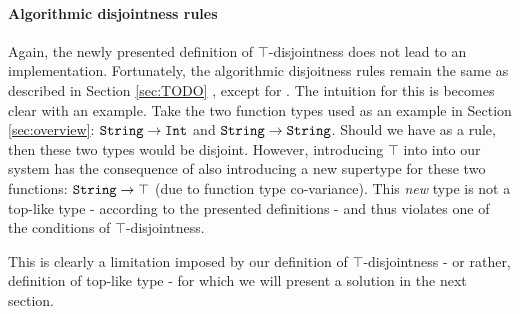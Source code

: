 





\paragraph{Algorithmic disjointness rules}

Again, the newly presented definition of $\top$-disjointness does not lead to an implementation. 
Fortunately, the algorithmic disjoitness rules remain the same as described in Section \ref{sec:TODO} 
, except for .
The intuition for this is becomes clear with an example.
Take the two function types used as an example in Section \ref{sec:overview}: 
$\texttt{String} \to \texttt{Int}$ and $\texttt{String} \to \texttt{String}$. 
Should we have  as a rule, then these two types would be disjoint. 
However, introducing $\top$ into into our system has the consequence of also introducing a new supertype for these 
two functions: $\texttt{String} \to \top$ (due to function type co-variance). 
This \emph{new} type is not a top-like type - according to the presented definitions - and thus violates one of the
conditions of $\top$-disjointness.

This is clearly a limitation imposed by our definition of $\top$-disjointness - or rather, definition of top-like type - 
for which we will present a solution in the next section.

